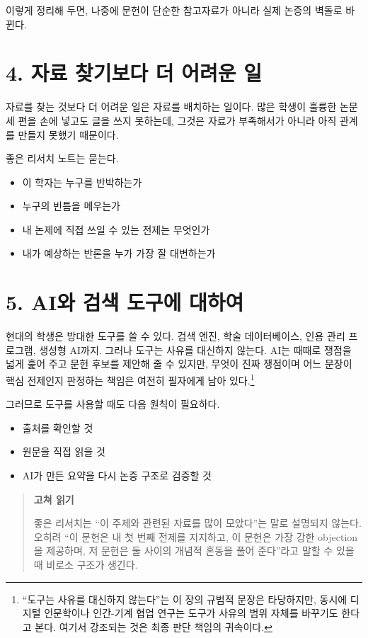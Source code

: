 이렇게 정리해 두면, 나중에 문헌이 단순한 참고자료가 아니라 실제 논증의 벽돌로 바뀐다.

\section{4. 자료 찾기보다 더 어려운 일}\label{4-uxc790uxb8cc-uxcc3euxae30uxbcf4uxb2e4-uxb354-uxc5b4uxb824uxc6b4-uxc77c}

자료를 찾는 것보다 더 어려운 일은 자료를 배치하는 일이다. 많은 학생이 훌륭한 논문 세 편을 손에 넣고도 글을 쓰지 못하는데, 그것은 자료가 부족해서가 아니라 아직 관계를 만들지 못했기 때문이다.

좋은 리서치 노트는 묻는다.

\begin{itemize}
\tightlist
\item
  이 학자는 누구를 반박하는가
\item
  누구의 빈틈을 메우는가
\item
  내 논제에 직접 쓰일 수 있는 전제는 무엇인가
\item
  내가 예상하는 반론을 누가 가장 잘 대변하는가
\end{itemize}

\section{5. AI와 검색 도구에 대하여}\label{5-aiuxc640-uxac80uxc0c9-uxb3c4uxad6cuxc5d0-uxb300uxd558uxc5ec}

현대의 학생은 방대한 도구를 쓸 수 있다. 검색 엔진, 학술 데이터베이스, 인용 관리 프로그램, 생성형 AI까지. 그러나 도구는 사유를 대신하지 않는다. AI는 때때로 쟁점을 넓게 훑어 주고 문헌 후보를 제안해 줄 수 있지만, 무엇이 진짜 쟁점이며 어느 문장이 핵심 전제인지 판정하는 책임은 여전히 필자에게 남아 있다.\footnote{``도구는 사유를 대신하지 않는다''는 이 장의 규범적 문장은 타당하지만, 동시에 디지털 인문학이나 인간-기계 협업 연구는 도구가 사유의 범위 자체를 바꾸기도 한다고 본다. 여기서 강조되는 것은 최종 판단 책임의 귀속이다.}

그러므로 도구를 사용할 때도 다음 원칙이 필요하다.

\begin{itemize}
\tightlist
\item
  출처를 확인할 것
\item
  원문을 직접 읽을 것
\item
  AI가 만든 요약을 다시 논증 구조로 검증할 것
\end{itemize}

\begin{quote}
\textbf{고쳐 읽기}

좋은 리서치는 ``이 주제와 관련된 자료를 많이 모았다''는 말로 설명되지 않는다. 오히려 ``이 문헌은 내 첫 번째 전제를 지지하고, 이 문헌은 가장 강한 objection을 제공하며, 저 문헌은 둘 사이의 개념적 혼동을 풀어 준다''라고 말할 수 있을 때 비로소 구조가 생긴다.
\end{quote}

